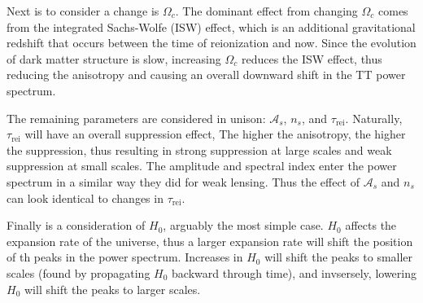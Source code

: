 Next is to consider a change is $\Omega_c$. The dominant effect from changing $\Omega_c$ comes from the integrated Sachs-Wolfe (ISW) effect, which is an additional gravitational redshift that occurs between the time of reionization and now. Since the evolution of dark matter structure is slow, increasing $\Omega_c$ reduces the ISW effect, thus reducing the anisotropy and causing an overall downward shift in the TT power spectrum.

The remaining parameters are considered in unison: $\mathcal{A}_s$, $n_s$, and $\tau_{\mathrm{rei}}$. Naturally, $\tau_{\mathrm{rei}}$ will have an overall suppression effect, The higher the anisotropy, the higher the suppression, thus resulting in strong suppression at large scales and weak suppression at small scales. The amplitude and spectral index enter the power spectrum in a similar way they did for weak lensing. Thus the effect of $\mathcal{A}_s$ and $n_s$ can look identical to changes in $\tau_\mathrm{rei}$.

Finally is a consideration of $H_0$, arguably the most simple case. $H_0$ affects the expansion rate of the universe, thus a larger expansion rate will shift the position of th peaks in the power spectrum. Increases in $H_0$ will shift the peaks to smaller scales (found by propagating $H_0$ backward through time), and invsersely, lowering $H_0$ will shift the peaks to larger scales.
